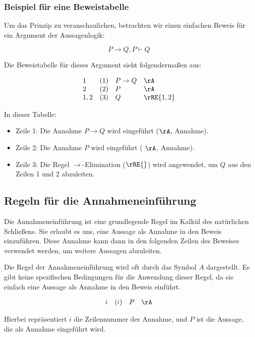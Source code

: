 \documentclass{book}
\theoremstyle{plain}
\theoremstyle{remark}
\theoremstyle{definition}
\begin{document}
\subsubsection{Beispiel für eine Beweistabelle}
Um das Prinzip zu veranschaulichen, betrachten wir einen einfachen Beweis für ein Argument der Aussagenlogik:

\[
P \rightarrow Q, P \vdash Q
\]

Die Beweistabelle für dieses Argument sieht folgendermaßen aus:

\[
\begin{array}{llll}
	1 & (1) & P \rightarrow Q & \rA \\
	2 & (2) & P & \rA \\
	1,2 & (3) & Q & \rRE{1,2} \\
\end{array}
\]

In dieser Tabelle:
\begin{itemize}
    \item Zeile 1: Die Annahme \(P \rightarrow Q\) wird eingeführt (\(\rA\), Annahme).
    \item Zeile 2: Die Annahme \(P\) wird eingeführt ( \(\rA \), Annahme).
    \item Zeile 3: Die Regel \(\rightarrow\)-Elimination (\(\rRE{}\)) wird angewendet, um \(Q\) aus den Zeilen 1 und 2 abzuleiten.
\end{itemize}



\subsection{Regeln für die Annahmeneinführung}
\label{rule:A}
Die Annahmeneinführung ist eine grundlegende Regel im Kalkül des natürlichen Schließens. Sie erlaubt es uns, eine Aussage als Annahme in den Beweis einzuführen. Diese Annahme kann dann in den folgenden Zeilen des Beweises verwendet werden, um weitere Aussagen abzuleiten.

Die Regel der Annahmeneinführung wird oft durch das Symbol \(A\) dargestellt. Es gibt keine spezifischen Bedingungen für die Anwendung dieser Regel, da sie einfach eine Aussage als Annahme in den Beweis einführt.

\[
\begin{array}{llll}	
i & (i) & P & \rA \\
\end{array}
\]

Hierbei repräsentiert \(i\) die Zeilennummer der Annahme, und \(P\) ist die Aussage, die als Annahme eingeführt wird.
\end{document}
